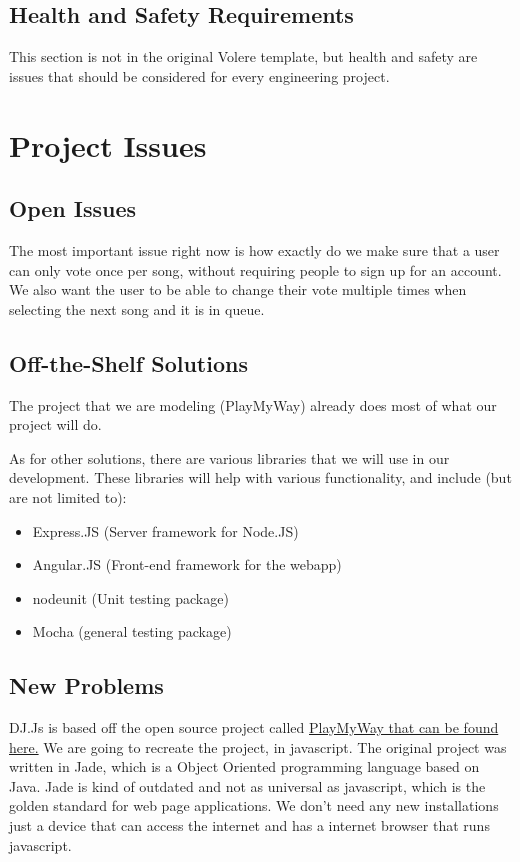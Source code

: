 \documentclass[12pt, titlepage]{article}
\begin{document}
\subsection{Health and Safety Requirements}


This section is not in the original Volere template, but health and safety are
issues that should be considered for every engineering project.

\section{Project Issues}

\subsection{Open Issues}

The most important issue right now is how exactly do we make sure that a user can only vote once per song, without requiring people to sign up for an account. We also want the user to be able to change their vote multiple times when selecting the next song and it is in queue.

\subsection{Off-the-Shelf Solutions}

The project that we are modeling (PlayMyWay) already does most of what our project will do.

As for other solutions, there are various libraries that we will use in our
development. These libraries will help with various functionality, and include
(but are not limited to):
\begin{itemize}
\item Express.JS (Server framework for Node.JS)
\item Angular.JS (Front-end framework for the webapp)
\item nodeunit (Unit testing package)
\item Mocha (general testing package)
\end{itemize}
\subsection{New Problems}

DJ.Js is based off the open source project called \href{https://github.com/malithsen/playmyway}{PlayMyWay that can be found here.} We are going to recreate the project, in javascript. The original project was written in Jade, which is a Object Oriented programming language based on Java. Jade is kind of outdated and not as universal as javascript, which is the golden standard for web page applications. We don't need any new installations just a device that can access the internet and has a internet browser that runs javascript.
\end{document}
